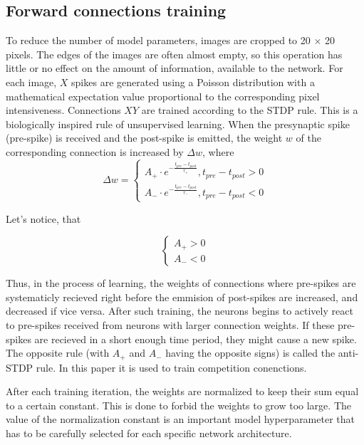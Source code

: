 \documentclass[a4paper]{article}
\begin{document}
\subsection{Forward connections training}
To reduce the number of model parameters, images are cropped to 20 $\times$ 20 pixels. The edges of the images are often almost empty, so this operation has little or no effect on the amount of information, available to the network. For each image, $X$ spikes are generated using a Poisson distribution with a mathematical expectation value  proportional to the corresponding pixel intensiveness. Connections $XY$ are trained according to the STDP \cite{STDP} rule. This is a biologically inspired rule of unsupervised learning. When the presynaptic spike (pre-spike) is received and the post-spike is emitted, the weight $w$ of the corresponding connection is increased by $ \Delta w $, where
\begin{equation} 
\Delta w =
 \begin{cases}
 A_+ \cdot e^{- \frac{t_{pre} - t_{post}}{\tau_+}}, t_{pre} - t_{post} > 0\\
 A_- \cdot e^{- \frac{t_{pre} - t_{post}}{\tau_-}}, t_{pre} - t_{post} < 0
 \end{cases}
\end{equation}

Let's notice, that

$$
\begin{cases}
 A_{+} > 0\\
 A_{-} < 0
\end{cases}
$$

Thus, in the process of learning, the weights of connections where pre-spikes are systematicly recieved right before the emmision of post-spikes are increased, and decreased if vice versa. After such training, the neurons begins to actively react to pre-spikes received from neurons with larger connection weights. If these pre-spikes are recieved in a short enough time period, they might cause a new spike. The opposite rule (with $A_{+}$ and $A_{-}$ having the opposite signs) is called the anti-STDP \cite{anti-STDP} rule. In this paper it is used to train competition conenctions.

After each training iteration, the weights are normalized to keep their sum equal to a certain constant. This is done to forbid the weights to grow too large. The value of the normalization constant is an important model hyperparameter that has to be carefully selected for each specific network architecture.
\end{document}
